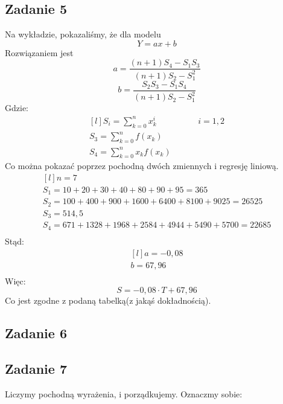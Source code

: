 \documentclass[a4paper]{article}
\begin{document}
\subsection*{Zadanie 5}
Na wykładzie, pokazaliśmy, że dla modelu $$Y=ax+b$$ Rozwiązaniem jest $$a=\frac{(n+1)S_4 - S_1S_3}{(n+1)S_2 - S_1^2} $$ $$b=\frac{S_2S_3-S_1S_4}{(n+1)S_2 - S_1^2} $$
Gdzie:
$$\begin{matrix*}[l]
S_i = \sum\limits_{k=0}^n x_k^i &&&& i=1,2\\
S_3 = \sum\limits_{k=0}^n f(x_k)\\
S_4 = \sum\limits_{k=0}^n x_k f(x_k)
\end{matrix*}$$
Co można pokazać poprzez pochodną dwóch zmiennych i regresję liniową.
$$
\begin{matrix*}[l]
n=7\\
S_1=10+20+30+40+80+90+95=365\\
S_2=100+400+900+1600+6400+8100+9025=26525\\
S_3=514,5\\
S_4=671+1328+1968+2584+4944+5490+5700=22685\\
\end{matrix*}
$$
Stąd:\\
$$
\begin{matrix*}[l]
a=-0,08\\
b=67,96\\
\end{matrix*}
$$
Więc:\\
$$ 
S=-0,08\cdot T + 67,96
$$
Co jest zgodne z podaną tabelką(z jakąś dokładnością).

\subsection*{Zadanie 6}


\subsection*{Zadanie 7}
Liczymy pochodną wyrażenia, i porządkujemy.
Oznaczmy sobie:
$$ $$
\end{document}
